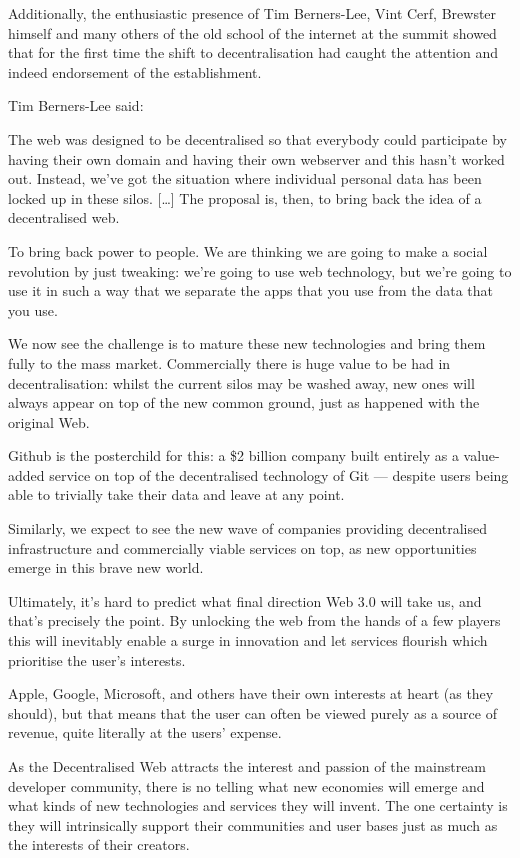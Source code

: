 \documentclass{tnreport}
\begin{document}
Additionally, the enthusiastic presence of Tim Berners-Lee, Vint Cerf, Brewster himself and many others of the old school of the internet at the summit showed that for the first time the shift to decentralisation had caught the attention and indeed endorsement of the establishment.

Tim Berners-Lee said:

The web was designed to be decentralised so that everybody could participate by having their own domain and having their own webserver and this hasn’t worked out. Instead, we’ve got the situation where individual personal data has been locked up in these silos. […] The proposal is, then, to bring back the idea of a decentralised web.

To bring back power to people. We are thinking we are going to make a social revolution by just tweaking: we’re going to use web technology, but we’re going to use it in such a way that we separate the apps that you use from the data that you use.

We now see the challenge is to mature these new technologies and bring them fully to the mass market. Commercially there is huge value to be had in decentralisation: whilst the current silos may be washed away, new ones will always appear on top of the new common ground, just as happened with the original Web.

Github is the posterchild for this: a \$2 billion company built entirely as a value-added service on top of the decentralised technology of Git — despite users being able to trivially take their data and leave at any point.

Similarly, we expect to see the new wave of companies providing decentralised infrastructure and commercially viable services on top, as new opportunities emerge in this brave new world.

Ultimately, it’s hard to predict what final direction Web 3.0 will take us, and that’s precisely the point. By unlocking the web from the hands of a few players this will inevitably enable a surge in innovation and let services flourish which prioritise the user’s interests.

Apple, Google, Microsoft, and others have their own interests at heart (as they should), but that means that the user can often be viewed purely as a source of revenue, quite literally at the users’ expense.

As the Decentralised Web attracts the interest and passion of the mainstream developer community, there is no telling what new economies will emerge and what kinds of new technologies and services they will invent. The one certainty is they will intrinsically support their communities and user bases just as much as the interests of their creators.
\end{document}
